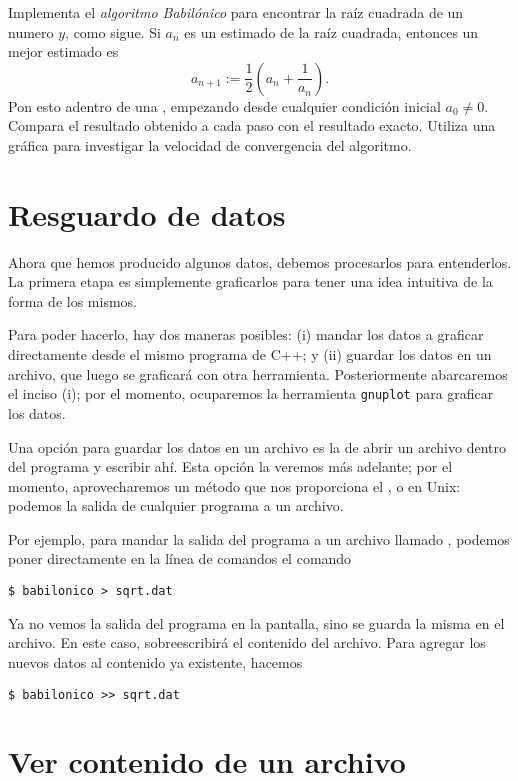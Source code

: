 \ejercicio
Implementa el \emph{algoritmo Babilónico} para encontrar la raíz cuadrada de
un numero $y$, como sigue.
Si $a_n$ es un estimado de la raíz cuadrada, entonces un mejor estimado es
\begin{equation}
 a_{n+1} := \frac{1}{2} \left(a_n + \frac{1}{a_n} \right).
\end{equation}
Pon esto adentro de una , empezando desde cualquier condición
inicial $a_0 \neq 0$.
Compara el resultado obtenido a cada paso con
el
resultado exacto. Utiliza una gráfica para investigar la velocidad de
convergencia del algoritmo.



\section{Resguardo de datos}
Ahora que hemos producido algunos datos, debemos procesarlos para entenderlos.
La primera etapa es simplemente graficarlos para tener una idea intuitiva de la
forma de los mismos.

Para poder hacerlo, hay dos maneras posibles: (i) mandar los datos a graficar
directamente desde el mismo programa de C++; y (ii) guardar los datos en un
archivo, que luego se graficará con otra herramienta. Posteriormente
abarcaremos el inciso (i); por el momento, ocuparemos la herramienta
\texttt{gnuplot} para graficar los datos.

Una opción para guardar los datos en un archivo es la de abrir un archivo
dentro del programa y escribir ahí. Esta opción la veremos más adelante; por el
momento, aprovecharemos un método que nos proporciona el , o
 en Unix: podemos  la salida de cualquier
programa a un archivo.  

Por ejemplo, para mandar la salida del programa
 a un archivo llamado , podemos poner
directamente en la línea de comandos el comando
\begin{lstlisting}
$ babilonico > sqrt.dat
\end{lstlisting}
Ya no vemos la salida del programa en la pantalla, sino se guarda la misma en
el archivo. En este caso, sobreescribirá el contenido del archivo. Para agregar
los nuevos datos al contenido ya existente, hacemos
\begin{lstlisting}
$ babilonico >> sqrt.dat
\end{lstlisting}

\section{Ver contenido de un archivo}

